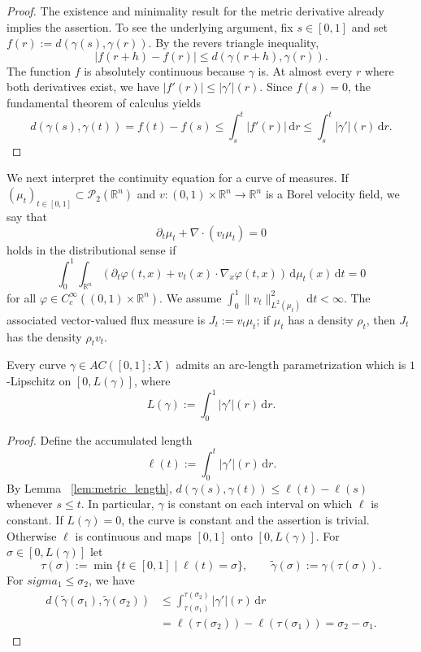 \begin{proof}
	The existence and minimality result for the metric derivative already implies the assertion. To see the underlying argument, fix $s\in[0,1]$ and set $f(r):=d(\gamma(s),\gamma(r))$. By the revers triangle inequality,
	$$
	|f(r+h)-f(r)|\leq d(\gamma(r+h),\gamma(r)).
	$$
	The function $f$ is absolutely continuous because $\gamma$ is. At almost every $r$ where both derivatives exist, we have $|f'(r)|\leq |\gamma'|(r)$. Since $f(s)=0$, the fundamental theorem of calculus yields
	$$
	d(\gamma(s),\gamma(t)) = f(t)-f(s)\leq \int_s^t|f'(r)|\,\mathrm{d}r\leq \int_s^t|\gamma'|(r)\,\mathrm{d}r.
	$$
\end{proof}

We next interpret the continuity equation for a curve of measures. If $(\mu_t)_{t\in[0,1]}\subset\mathscr{P}_2(\mathbb{R}^n)$ and $v:(0,1)\times \mathbb{R}^n\to \mathbb{R}^n$ is a Borel velocity field, we say that 
\begin{equation*}
	\partial_t\mu_t+\nabla\cdot(v_t\mu_t) = 0 \label{eq_ce_measure}
\end{equation*}
holds in the distributional sense if 
\begin{equation*}
	\int_0^1\int_{\mathbb{R}^n} \left(\partial_t\varphi(t,x) + v_t(x)\cdot\nabla_x\varphi(t,x)\right)\,\mathrm{d}\mu_t(x)\,\mathrm{d}t = 0\label{eq:ce_weak}
\end{equation*}
for all $\varphi\in C_c^\infty((0,1)\times \mathbb{R}^n)$. We assume $\int_0^1\|v_t\|_{L^2(\mu_t)}^2\,\mathrm{d}t<\infty$. The associated vector-valued flux measure is $J_t:=v_t\mu_t$; if $\mu_t$ has a density $\rho_t$, then $J_t$ has the density $\rho_t v_t$.

\begin{lemma}
	\label{lem:arc_length}
	Every curve $\gamma\in AC([0,1];X)$ admits an arc-length parametrization which is $1$-Lipschitz on $[0,L(\gamma)]$, where 
	$$
	L(\gamma):=\int_0^1 |\gamma'|(r)\,\mathrm{d}r.
	$$
\end{lemma}
\begin{proof}
	Define the accumulated length
	$$
	\ell(t) :=\int_0^t|\gamma'|(r)\,\mathrm{d}r.
	$$
	By Lemma ~\ref{lem:metric_length}, $d(\gamma(s),\gamma(t))\leq\ell(t)-\ell(s)$ whenever $s\leq t$. In particular, $\gamma$ is constant on each interval on which $\ell$ is constant. If $L(\gamma)=0$, the curve is constant and the assertion is trivial. Otherwise $\ell$ is continuous and maps $[0,1]$ onto $[0,L(\gamma)]$. For $\sigma \in [0,L(\gamma)]$ let
	$$
	\tau(\sigma):=\min\{t\in[0,1] \mid \ell(t)=\sigma\}, \qquad \widetilde\gamma(\sigma):=\gamma(\tau(\sigma)).
	$$
	For $sigma_1\leq\sigma_2$, we have
	\begin{align*}
		d(\widetilde\gamma(\sigma_1),\widetilde\gamma(\sigma_2)) &\leq \int_{\tau(\sigma_1)}^{\tau(\sigma_2)}|\gamma'|(r)\,\mathrm{d}r\\
																 &=\ell(\tau(\sigma_2))-\ell(\tau(\sigma_1)) = \sigma_2-\sigma_1.
	\end{align*}
\end{proof}

